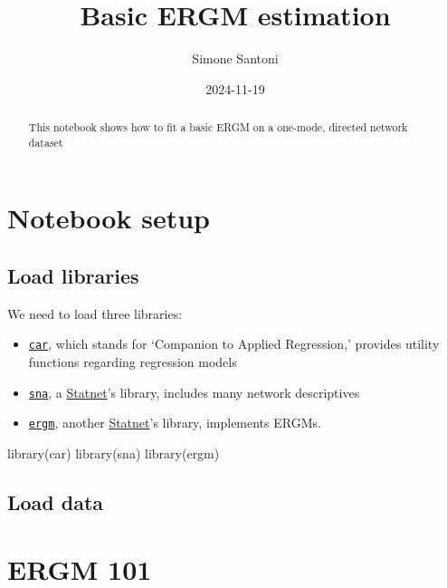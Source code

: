 \documentclass[
  letterpaper,
  DIV=11,
  numbers=noendperiod]{scrartcl}
\title{Basic ERGM estimation}
\author{Simone Santoni}
\date{2024-11-19}
\newenvironment{Shaded}{\begin{snugshade}}{\end{snugshade}}
\newcommand{\FunctionTok}[1]{\textcolor[rgb]{0.28,0.35,0.67}{#1}}
\newcommand{\NormalTok}[1]{\textcolor[rgb]{0.00,0.23,0.31}{#1}}
\providecommand{\tightlist}{%
  \setlength{\itemsep}{0pt}\setlength{\parskip}{0pt}}\usepackage{longtable,booktabs,array}
\begin{document}
\maketitle
\begin{abstract}
This notebook shows how to fit a basic ERGM on a one-mode, directed
network dataset
\end{abstract}


\section{Notebook setup}\label{notebook-setup}

\subsection{Load libraries}\label{load-libraries}

We need to load three libraries:

\begin{itemize}
\tightlist
\item
  \href{https://cran.r-project.org/web/packages/car/car.pdf}{\texttt{car}},
  which stands for `Companion to Applied Regression,' provides utility
  functions regarding regression models
\item
  \href{https://cran.r-project.org/web/packages/sna/index.html}{\texttt{sna}},
  a \href{https://statnet.org/}{Statnet}'s library, includes many
  network descriptives
\item
  \href{}{\texttt{ergm}}, another \href{https://statnet.org/}{Statnet}'s
  library, implements ERGMs.
\end{itemize}

\begin{Shaded}
\begin{Highlighting}[]
\FunctionTok{library}\NormalTok{(car)}
\FunctionTok{library}\NormalTok{(sna)}
\FunctionTok{library}\NormalTok{(ergm)}
\end{Highlighting}
\end{Shaded}

\subsection{Load data}\label{load-data}

\section{ERGM 101}\label{ergm-101}
\end{document}
